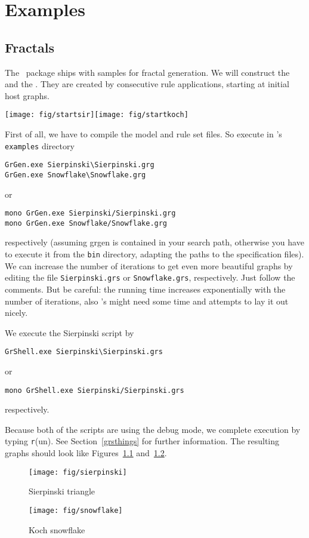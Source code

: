 \chapter{Examples}
\label{anexample}

\section{Fractals}
\label{fractals}

The \GrG\ package ships with samples for fractal generation.
We will construct the  and the .
They are created by consecutive rule applications, starting at initial host graphs.

\begin{center}
\texttt{[image: fig/startsir]}\quad\quad\texttt{[image: fig/startkoch]}
\end{center}

First of all, we have to compile the model and rule set files.
So execute in \GrG's \texttt{examples} directory
\begin{verbatim}
GrGen.exe Sierpinski\Sierpinski.grg
GrGen.exe Snowflake\Snowflake.grg
\end{verbatim}
or
\begin{verbatim}
mono GrGen.exe Sierpinski/Sierpinski.grg
mono GrGen.exe Snowflake/Snowflake.grg
\end{verbatim}
respectively (assuming grgen is contained in your search path, otherwise you have to execute it from the \texttt{bin} directory, adapting the paths to the specification files). 
We can increase the number of iterations to get even more beautiful graphs by editing the file \texttt{Sierpinski.grs} or \texttt{Snowflake.grs}, respectively.
Just follow the comments.
But be careful: the running time increases exponentially with the number of iterations, also \yComp's  might need some time and attempts to lay it out nicely.

We execute the Sierpinski script by
\begin{verbatim}
GrShell.exe Sierpinski\Sierpinski.grs
\end{verbatim}
or
\begin{verbatim}
mono GrShell.exe Sierpinski/Sierpinski.grs
\end{verbatim}
respectively. 

Because both of the scripts are using the debug mode, we complete execution by typing \texttt{r}(un).
See Section~\ref{grsthings} for further information.
The resulting graphs should look like Figures~\ref{figsierp} and~\ref{figsnowflake}.
\begin{figure}[htbp]
  \centering
  \texttt{[image: fig/sierpinski]}
  \caption{Sierpinski triangle}
  \label{figsierp}
\end{figure}
\begin{figure}[htbp]
  \centering
  \texttt{[image: fig/snowflake]}
  \caption{Koch snowflake}
  \label{figsnowflake}
\end{figure}
\vfill
\pagebreak


